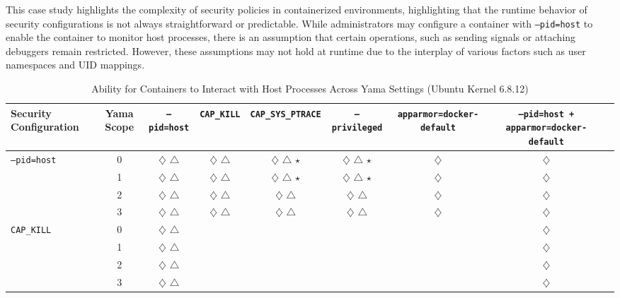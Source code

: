 \documentclass[12pt]{report}
\begin{document}
\begin{doublespace}
This case study highlights the complexity of security policies in containerized environments, highlighting that the runtime behavior of security configurations is not always straightforward or predictable. While administrators may configure a container with \texttt{--pid=host} to enable the container to monitor host processes, there is an assumption that certain operations, such as sending signals or attaching debuggers remain restricted. However, these assumptions may not hold at runtime due to the interplay of various factors such as user namespaces and UID mappings.


\begin{table}[!h]
    \centering
    \footnotesize
    \setlength{\tabcolsep}{4pt}
    \renewcommand{\arraystretch}{1.1}
    \caption{Ability for Containers to Interact with Host Processes Across Yama Settings (Ubuntu Kernel 6.8.12)}
    \label{tab:combined-pid-namespace-security}
    \begin{adjustbox}{max width=\textwidth}
    \begin{tabular}{|l|c|c|c|c|c|c|c|c|}
        \hline
        \textbf{Security Configuration} & \textbf{Yama Scope} & \texttt{--pid=host} & \texttt{CAP\_KILL} & \texttt{CAP\_SYS\_PTRACE} & \texttt{--privileged} & \texttt{apparmor=docker-default} & \texttt{--pid=host + apparmor=docker-default} \\
        \hline

        \multirow{4}{*}{\texttt{--pid=host}} 
            & 0 & $\diamondsuit$ $\triangle$ & $\diamondsuit$ $\triangle$ & $\diamondsuit$ $\triangle$ $\star$ & $\diamondsuit$ $\triangle$ $\star$ & $\diamondsuit$ & $\diamondsuit$ \\
            & 1 & $\diamondsuit$ $\triangle$ & $\diamondsuit$ $\triangle$ & $\diamondsuit$ $\triangle$ $\star$ & $\diamondsuit$ $\triangle$ $\star$ & $\diamondsuit$ & $\diamondsuit$ \\
            & 2 & $\diamondsuit$ $\triangle$ & $\diamondsuit$ $\triangle$ & $\diamondsuit$ $\triangle$ & $\diamondsuit$ $\triangle$ & $\diamondsuit$ & $\diamondsuit$ \\
            & 3 & $\diamondsuit$ $\triangle$ & $\diamondsuit$ $\triangle$ & $\diamondsuit$ $\triangle$ & $\diamondsuit$ $\triangle$ & $\diamondsuit$ & $\diamondsuit$ \\
        \hline

        \multirow{4}{*}{\texttt{CAP\_KILL}} 
            & 0 & $\diamondsuit$ $\triangle$ &  &  &  &  & $\diamondsuit$ \\
            & 1 & $\diamondsuit$ $\triangle$ &  &  &  &  & $\diamondsuit$ \\
            & 2 & $\diamondsuit$ $\triangle$ &  &  &  &  & $\diamondsuit$ \\
            & 3 & $\diamondsuit$ $\triangle$ &  &  &  &  & $\diamondsuit$ \\
        \hline


\end{tabular}
\end{adjustbox}
\end{table}
\end{doublespace}
\end{document}
